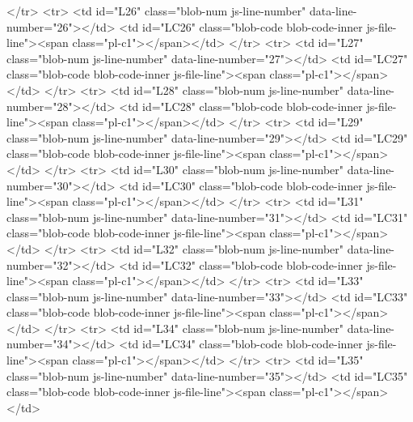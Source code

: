       </tr>
      <tr>
        <td id="L26" class="blob-num js-line-number" data-line-number="26"></td>
        <td id="LC26" class="blob-code blob-code-inner js-file-line"><span class="pl-c1">\let\pgf@sh@openrectangle@bbg@n\pgf@sh@openrectangle@bbg@e</span></td>
      </tr>
      <tr>
        <td id="L27" class="blob-num js-line-number" data-line-number="27"></td>
        <td id="LC27" class="blob-code blob-code-inner js-file-line"><span class="pl-c1">\let\pgf@sh@openrectangle@bbg@s\pgf@sh@openrectangle@bbg@e</span></td>
      </tr>
      <tr>
        <td id="L28" class="blob-num js-line-number" data-line-number="28"></td>
        <td id="LC28" class="blob-code blob-code-inner js-file-line"><span class="pl-c1">\let\pgf@sh@openrectangle@bbg@w\pgf@sh@openrectangle@bbg@e</span></td>
      </tr>
      <tr>
        <td id="L29" class="blob-num js-line-number" data-line-number="29"></td>
        <td id="LC29" class="blob-code blob-code-inner js-file-line"><span class="pl-c1">\let\pgf@sh@openrectangle@bbg@ns\pgf@sh@openrectangle@bbg@e</span></td>
      </tr>
      <tr>
        <td id="L30" class="blob-num js-line-number" data-line-number="30"></td>
        <td id="LC30" class="blob-code blob-code-inner js-file-line"><span class="pl-c1">\let\pgf@sh@openrectangle@bbg@ew\pgf@sh@openrectangle@bbg@e</span></td>
      </tr>
      <tr>
        <td id="L31" class="blob-num js-line-number" data-line-number="31"></td>
        <td id="LC31" class="blob-code blob-code-inner js-file-line"><span class="pl-c1">\let\pgf@sh@openrectangle@bbg@full\pgf@sh@openrectangle@full</span></td>
      </tr>
      <tr>
        <td id="L32" class="blob-num js-line-number" data-line-number="32"></td>
        <td id="LC32" class="blob-code blob-code-inner js-file-line"><span class="pl-c1">\let\pgf@sh@openrectangle@bbg@\pgf@sh@openrectangle@</span></td>
      </tr>
      <tr>
        <td id="L33" class="blob-num js-line-number" data-line-number="33"></td>
        <td id="LC33" class="blob-code blob-code-inner js-file-line"><span class="pl-c1">\let\pgf@sh@openrectangle@bbg@enw\pgf@sh@openrectangle@enw</span></td>
      </tr>
      <tr>
        <td id="L34" class="blob-num js-line-number" data-line-number="34"></td>
        <td id="LC34" class="blob-code blob-code-inner js-file-line"><span class="pl-c1">\let\pgf@sh@openrectangle@bbg@ens\pgf@sh@openrectangle@ens</span></td>
      </tr>
      <tr>
        <td id="L35" class="blob-num js-line-number" data-line-number="35"></td>
        <td id="LC35" class="blob-code blob-code-inner js-file-line"><span class="pl-c1">\let\pgf@sh@openrectangle@bbg@ews\pgf@sh@openrectangle@ews</span></td>
